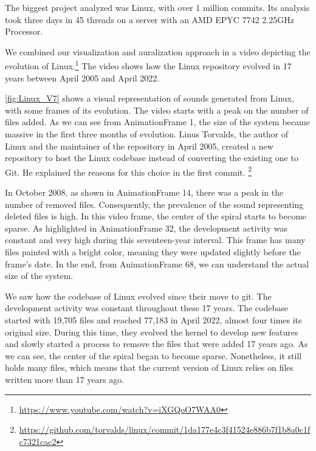 \documentclass[11pt,twoside,english,singlespacing,headsepline,consistentlayout]{auxiliary/si-msc-thesis}
\begin{document}
The biggest project analyzed was Linux, with over 1 million commits. Its analysis took three days in 45 threads on a server with an AMD EPYC 7742 2.25GHz Processor. 

We combined our visualization and auralization approach in a video depicting the evolution of Linux.\footnote{\url{https://www.youtube.com/watch?v=iXGQoO7WAA0}}
The video shows how the Linux repository evolved in 17 years between April 2005 and April 2022. 

\autoref{fig:Linux_V7} shows a visual representation of sounds generated from Linux, with some frames of its evolution. The video starts with a peak on the number of files added. As we can see from AnimationFrame 1, the size of the system became massive in the first three months of evolution. Linus Torvalds, the author of Linux and the maintainer of the repository in April 2005, created a new repository to host the Linux codebase instead of converting the existing one to Git. He explained the reasons for this choice in the first commit. \footnote{\url{https://github.com/torvalds/linux/commit/1da177e4c3f41524e886b7f1b8a0c1fc7321cac2}}

In October 2008, as shown in AnimationFrame 14, there was a peak in the number of removed files. Consequently, the prevalence of the sound representing deleted files is high. In this video frame, the center of the spiral starts to become sparse. As highlighted in AnimationFrame 32, the development activity was constant and very high during this 
seventeen-year interval. This frame has many files painted with a bright color, meaning they were updated slightly before the frame's date. 
In the end, from AnimationFrame 68, we can understand the actual size of the system.

 We saw how the codebase of Linux evolved since their move to git. The development activity was constant throughout these 17 years. The codebase started with 19,705 files and reached 77,183 in April 2022, almost four times its original size. During this time, they evolved the kernel to develop new features and slowly started a process to remove the files that were added 17 years ago. As we can see, the center of the spiral began to become sparse. Nonetheless, it still holds many files, which means that the current version of Linux relies on files written more than 17 years ago. 
\end{document}
